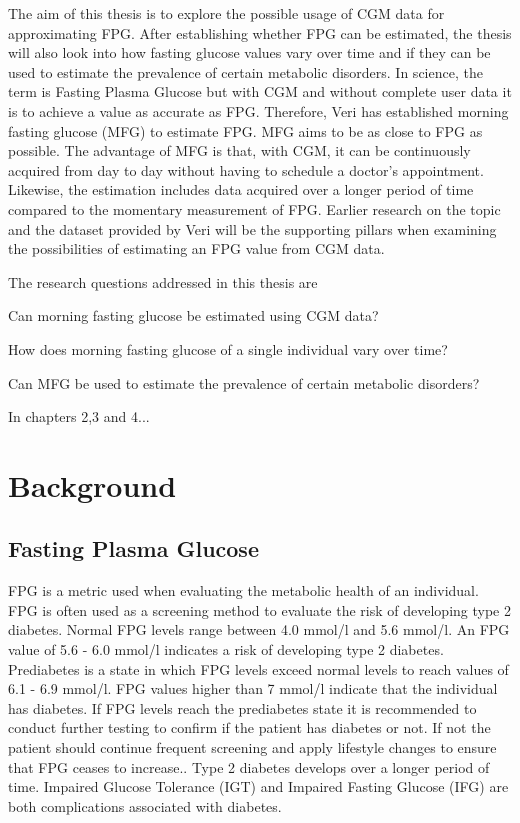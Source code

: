 \documentclass[english, 12pt, a4paper, elec, utf8, a-1b, online]{aaltothesis}
\begin{document}
The aim of this thesis is to explore the possible usage of CGM 
data for approximating FPG. After establishing whether FPG can be 
estimated, the thesis will also look into how fasting glucose values 
vary over time and if they can be used to estimate the prevalence of 
certain metabolic disorders. In science, the term is Fasting Plasma Glucose but with CGM and without 
complete user data it is to achieve a value as accurate as 
FPG. Therefore, Veri has established morning fasting glucose (MFG) to estimate FPG. 
MFG aims to be as close to FPG as possible. The advantage
of MFG is that, with CGM, it can be continuously acquired from day to day without 
having to schedule a doctor's appointment. Likewise, the estimation includes data 
acquired over a longer period of time compared to the momentary measurement of FPG. 
Earlier research on the topic and the dataset provided by Veri will 
be the supporting pillars when examining the possibilities of estimating an 
FPG value from CGM data. 

The research questions addressed in this thesis are
\begin{questions}[leftmargin=50pt]
    \item Can morning fasting glucose be estimated using CGM data?
    \item How does morning fasting glucose of a single individual vary over time?
    \item Can MFG be used to estimate the prevalence of certain metabolic disorders? \label{itm:qwithlabel}
\end{questions}

In chapters 2,3 and 4...


\clearpage


\section{Background}
\subsection{Fasting Plasma Glucose}
FPG is a metric used when evaluating the metabolic health of an individual.
FPG is often used as a screening method to evaluate the risk of developing type 2 diabetes.
Normal FPG levels range between 4.0 mmol/l and 5.6 mmol/l. An FPG value of 5.6 - 6.0 mmol/l 
indicates a risk of developing type 2 diabetes. Prediabetes is a state in which FPG
levels exceed normal levels to reach values of 6.1 - 6.9 mmol/l. FPG values
higher than 7 mmol/l indicate that the individual has diabetes\cite{mathew_blood_2022}. 
If FPG levels reach the prediabetes state it is recommended to conduct further testing to confirm if 
the patient has diabetes or not. If not the patient should continue frequent screening and apply 
lifestyle changes to ensure that FPG ceases to increase.\cite{ekoe_screening_2018}.
Type 2 diabetes develops over a longer period of time. Impaired Glucose Tolerance (IGT) and Impaired Fasting
Glucose (IFG) are both complications associated with diabetes\cite{walker_diet_2010}. 
\end{document}

